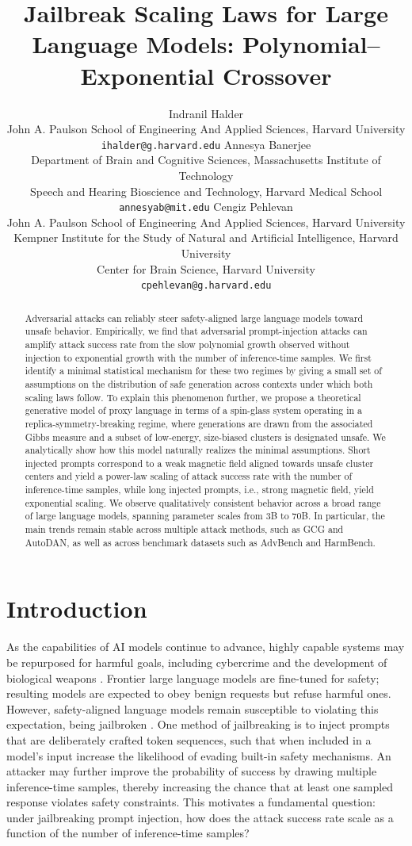\documentclass{article}
\title{Jailbreak Scaling Laws for Large Language Models: Polynomial–Exponential Crossover}
\author{Indranil Halder \\ John A. Paulson School of Engineering And Applied Sciences, Harvard University\\ \texttt{ihalder@g.harvard.edu} \AND Annesya Banerjee \\ Department of Brain and Cognitive Sciences, Massachusetts Institute of Technology\\
Speech and Hearing Bioscience and Technology, Harvard Medical School\\ \texttt{annesyab@mit.edu} \AND Cengiz Pehlevan\\ John A. Paulson School of Engineering And Applied Sciences, Harvard University\\ Kempner Institute for the Study of Natural and Artificial Intelligence, Harvard University\\Center for Brain Science, Harvard University \\\texttt{cpehlevan@g.harvard.edu} }
\theoremstyle{remark} %
\begin{document}
\maketitle


\begin{abstract}
  Adversarial attacks can reliably steer safety-aligned large language models toward unsafe behavior. Empirically, we find that adversarial prompt-injection attacks can amplify attack success rate from the slow polynomial growth observed without injection to exponential growth with the number of inference-time samples. We first identify a minimal statistical mechanism for these two regimes by giving a small set of assumptions on the distribution of safe generation across contexts under which both scaling laws follow. To explain this phenomenon further, we propose a theoretical generative model of proxy language in terms of a spin-glass system operating in a replica-symmetry-breaking regime, where generations are drawn from the associated Gibbs measure and a subset of low-energy, size-biased clusters is designated unsafe. We analytically show how this model naturally realizes the minimal assumptions. Short injected prompts correspond to a weak magnetic field aligned towards unsafe cluster centers and yield a power-law scaling of attack success rate with the number of inference-time samples, while long injected prompts, i.e., strong magnetic field, yield exponential scaling. We observe qualitatively consistent behavior across a broad range of large language models, spanning parameter scales from 3B to 70B. In particular, the main trends remain stable across multiple attack methods, such as GCG and AutoDAN, as well as across benchmark datasets such as AdvBench and HarmBench. 
\end{abstract}



\section{Introduction}\label{sec:problem_setup}

As the capabilities of AI models continue to advance, highly capable systems may be repurposed for harmful goals, including cybercrime and the development of biological weapons \citep{openai2023preparednessframeworkbeta, phuong2024evaluating, anthropic2024responsiblescalingpolicy}. Frontier large language models are fine-tuned for safety; resulting models are expected to obey benign requests but refuse harmful ones. However, safety-aligned language models remain susceptible to violating this expectation, being jailbroken \citep{wei2023jailbroken}. One method of jailbreaking is to inject prompts that are deliberately crafted token sequences, such that when included in a model’s input increase the likelihood of evading built-in safety mechanisms. An attacker may further improve the probability of success by drawing multiple inference-time samples, thereby increasing the chance that at least one sampled response violates safety constraints.  This motivates a fundamental question: under jailbreaking prompt injection, how does the attack success rate scale as a function of the number of inference-time samples?
\end{document}
